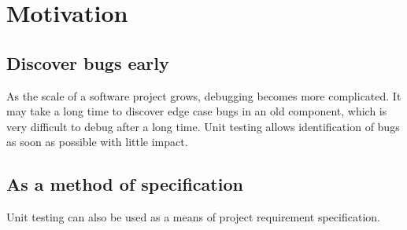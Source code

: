 \section{Motivation}
\subsection{Discover bugs early}
As the scale of a software project grows, debugging becomes more complicated.
It may take a long time to discover edge case bugs in an old component, which is very difficult to debug after a long time.
Unit testing allows identification of bugs as soon as possible with little impact.

\subsection{As a method of specification}
Unit testing can also be used as a means of project requirement specification.
